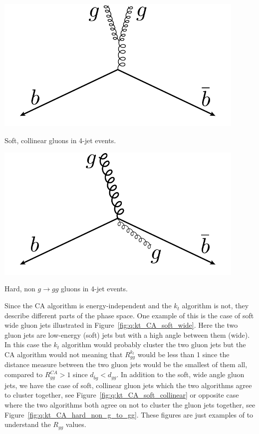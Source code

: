 \begin{marginfigure}[1cm]
  \centerfloat
  \includegraphics[width=0.9\textwidth]{figures/R_kt_CA/soft_collinear.pdf}
  \caption[Soft Collinear Gluons in 4-Jet Events]
          {Soft, collinear gluons in 4-jet events.} 
  \label{fig:q:kt_CA_soft_collinear}
\end{marginfigure}

\begin{marginfigure}[1cm]
  \centerfloat
  \includegraphics[width=0.9\textwidth]{figures/R_kt_CA/hard_non_g_to_gg.pdf}
  \caption[Hard Non $g\rightarrow gg$ Gluons in 4-Jet Events]
          {Hard, non $g\rightarrow gg$ gluons in 4-jet events.} 
  \label{fig:q:kt_CA_hard_non_g_to_gg}
\end{marginfigure}

Since the CA algorithm is energy-independent and the $k_t$ algorithm is not, they describe different parts of the phase space. One example of this is the case of soft wide gluon jets illustrated in Figure~\ref{fig:q:kt_CA_soft_wide}. Here the two gluon jets are low-energy (soft) jets but with a high angle between them (wide). In this case the $k_t$ algorithm would probably cluster the two gluon jets but the CA algorithm would not meaning that $R_{gg}^{k_t}$ would be less than \num{1} since the distance measure between the two gluon jets would be the smallest of them all, compared to $R_{gg}^{CA} > 1$ since $d_{\bar{b}g} < d_{gg}$. In addition to the soft, wide angle gluon jets, we have the case of soft, collinear gluon jets which the two algorithms agree to cluster together, see Figure~\ref{fig:q:kt_CA_soft_collinear} or opposite case where the two algorithms both agree on not to cluster the gluon jets together, see Figure~\ref{fig:q:kt_CA_hard_non_g_to_gg}. These figures are just examples of to understand the $R_{gg}$ values.

